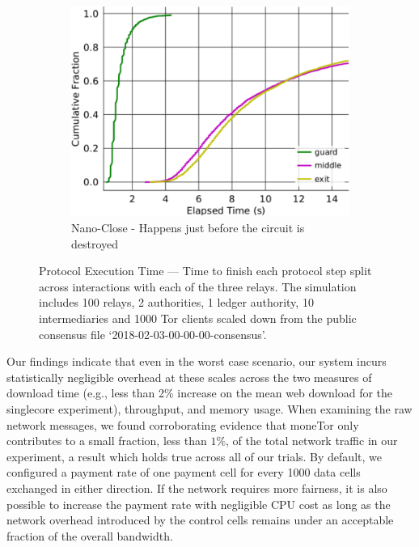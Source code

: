\begin{figure}[t]
\begin{subfigure}[t]{0.32\textwidth}
\label{fig:ttfp}
	\end{subfigure}
	\begin{subfigure}[t]{0.32\textwidth} \centering
\includegraphics[trim={0 0cm 0 0cm}, clip,
  width=1.0\textwidth]{images/payment_close.pdf}
		\caption{Nano-Close - Happens just before the circuit is
                  destroyed}
\label{fig:payments_close}
	\end{subfigure}
	\caption{Protocol Execution Time --- Time to finish each protocol step
          split across interactions with each of the three relays. The
          simulation includes 100 relays, 2 authorities, 1 ledger authority, 10
          intermediaries and 1000 Tor clients scaled down from the public
          consensus file `2018-02-03-00-00-00-consensus'.}
\label{fig:latencymeasurements}
\end{figure}

Our findings indicate that even in the worst case scenario, our system incurs
statistically negligible overhead at these scales across the two measures of
download time (e.g., less than 2\% increase on the mean web download for the
singlecore experiment), throughput, and memory usage. When examining the raw
network messages, we found corroborating evidence that moneTor only contributes
to a small fraction, less than $1\%$, of the total network traffic in our
experiment, a result which holds true across all of our trials. By default, we
configured a payment rate of one payment cell for every 1000 data cells
exchanged in either direction. If the network requires more fairness, it is also
possible to increase the payment rate with negligible CPU cost as long as the
network overhead introduced by the control cells remains under an acceptable
fraction of the overall bandwidth.

